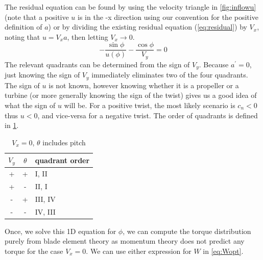 \documentclass{article}
\begin{document}
The residual equation can be found by using the velocity triangle in \cref{fig:inflowu} (note that a positive $u$ is in the -x direction using our convention for the positive definition of $a$) or by dividing the existing residual equation (\cref{eq:residual}) by $V_x$, noting that $u = V_x a$, then letting $V_x \rightarrow 0$.
\begin{equation}
    - \frac{\sin\phi}{u(\phi)} - \frac{\cos\phi}{V_y} = 0
\end{equation}
The relevant quadrants can be determined from the sign of $V_y$.  Because $a^\prime = 0$, just knowing the sign of $V_y$ immediately eliminates two of the four quadrants.  The sign of $u$ is not known, however knowing whether it is a propeller or a turbine (or more generally knowing the sign of the twist) gives us a good idea of what the sign of $u$ will be.  For a positive twist, the most likely scenario is $c_n < 0$ thus $u < 0$, and vice-versa for a negative twist.  The order of quadrants is defined in \cref{tab:bracket2}.

\begin{table}[htb]
\centering
\caption{$V_x = 0$, $\theta$ includes pitch}
\label{tab:bracket2}
\begin{tabular}{@{}ccl@{}}
\toprule
$V_y$ & $\theta$ & quadrant order \\
\midrule
+ & + & I, II \\
+ & - & II, I \\
- & + & III, IV \\
- & - & IV, III \\
\bottomrule
\end{tabular}
\end{table}


Once, we solve this 1D equation for $\phi$, we can compute the torque distribution purely from blade element theory as momentum theory does not predict any torque for the case $V_x = 0$. We can use either expression for $W$ in \cref{eq:Wopt}.

\end{document}
